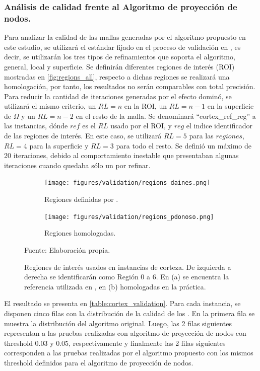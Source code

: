 %



\subsubsection{ Análisis de calidad frente al Algoritmo de proyección de nodos.}

Para analizar la calidad de las mallas generadas por el algoritmo propuesto en este estudio, se utilizará el estándar fijado en el proceso de validación en \cite{daines2018repairing}, es decir, se utilizarán los tres tipos de refinamientos que soporta el algoritmo, general, local y superficie. Se definirán diferentes regiones de interés (ROI) mostradas en \autoref{fig:regions_all}, respecto a dichas regiones se realizará una homologación, por tanto, los resultados no serán comparables con total precisión. Para reducir la cantidad de iteraciones generadas por el efecto dominó, se utilizará el mismo criterio, un $RL = n$ en la ROI, un $RL = n - 1$ en la superficie de $\Omega$ y un $RL = n - 2$ en el resto de la malla. Se denominará ``cortex\_ref\_reg'' a las instancias, dónde $ref$ es el $RL$ usado por el ROI, y $reg$ el indice identificador de las regiones de interés. En este caso, se utilizará $RL=5$ para las $regiones$, $RL=4$ para la superficie y $RL=3$ para todo el resto. Se definió un máximo de 20 iteraciones, debido al comportamiento inestable que presentaban algunas iteraciones cuando quedaba sólo un \octant{} por refinar.

\begin{figure}[H]
	\centering
	\begin{subfigure}[t]{0.8\textwidth}
		\texttt{[image: figures/validation/regions\_daines.png]}
		\caption{Regiones definidas por \cite{daines2018repairing}.}
	\end{subfigure}
	\begin{subfigure}[t]{1.0\textwidth}
		\texttt{[image: figures/validation/regions\_pdonoso.png]}
		\caption{Regiones homologadas.}
	\end{subfigure}
	\caption{ Regiones de interés usados en instancias de corteza. De izquierda a derecha se identificarán como Región 0 a 6. En (a) se encuentra la referencia utilizada en \cite{daines2018repairing}, en (b) homologadas en la práctica.}
	Fuente: Elaboración propia.
	\label{fig:regions_all}
\end{figure}

El resultado se presenta en \autoref{table:cortex_validation}. Para cada instancia, se disponen cinco filas con la distribución de la calidad de los \elements{}. En la primera fila se muestra la distribución del algoritmo original. Luego, las 2 filas siguientes representan a las pruebas realizadas con algoritmo de proyección de nodos con threshold $0.03$ y $0.05$, respectivamente y finalmente las 2 filas siguientes corresponden a las pruebas realizadas por el algoritmo propuesto con los mismos threshold definidos para el algoritmo de proyección de nodos.

